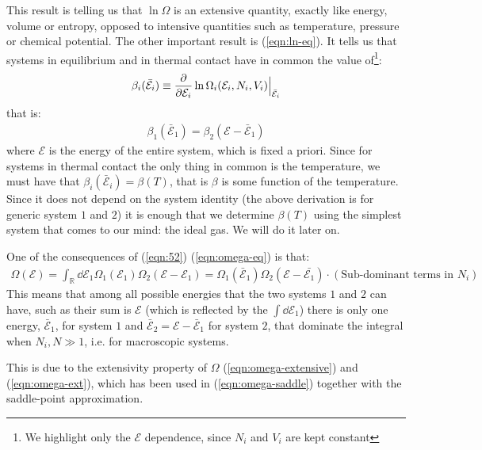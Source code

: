 \documentclass[../../main.tex]{subfiles}
\begin{document}
This result is telling us that $\ln \Omega$ is an extensive quantity, exactly like energy, volume or entropy, opposed to intensive quantities such as temperature, pressure or chemical potential. The other important result is (\ref{eqn:ln-eq}). It tells us that systems in equilibrium and in thermal contact have in common the value of\footnote{We highlight only the $\mathcal{E}$ dependence, since $N_i$ and $V_i$ are kept constant}:
\begin{align*}
    \beta_i(\bar{\mathcal{E}}_i) \equiv \pdv{\mathcal{E}_i} \ln \Omega_i(\mathcal{E}_i, N_i, V_i)\Big|_{\bar{\mathcal{E}}_i}
\end{align*}
that is:
\begin{align*}
    \beta_1(\bar{\mathcal{E}}_1) = \beta_2(\mathcal{E}- \bar{\mathcal{E}}_1)
\end{align*}
where $\mathcal{E}$ is the energy of the entire system, which is fixed a priori. Since for systems in thermal contact the only thing in common is the temperature, we must have that $\beta_i(\bar{\mathcal{E}}_i) = \beta(T)$, that is $\beta$ is some function of the temperature. Since it does not depend on the system identity (the above derivation is for generic system $1$ and $2$) it is enough that we determine $\beta(T)$ using the simplest system that comes to our mind: the ideal gas. We will do it later on.

\medskip

One of the consequences of (\ref{eqn:52}) (\ref{eqn:omega-eq}) is that:
\begin{align*}
    \Omega(\mathcal{E}) = \int_{\mathbb{R}} \dd{\mathcal{E}_1} \Omega_1(\mathcal{E}_1) \Omega_2(\mathcal{E}- \mathcal{E}_1) = \Omega_1(\bar{\mathcal{E}}_1) \Omega_2 (\mathcal{E}-\bar{\mathcal{E}_1}) \cdot (\text{Sub-dominant terms in $N_i$})
\end{align*}
This means that among all possible energies that the two systems $1$ and $2$ can have, such as their sum is $\mathcal{E}$ (which is reflected by the $\int \dd{\mathcal{E}_1}$) there is only one energy, $\bar{\mathcal{E}}_1$, for system $1$ and $\bar{\mathcal{E}}_2 = \mathcal{E}- \bar{\mathcal{E}}_1$ for system $2$, that dominate the integral when $N_i, N \gg 1$, i.e. for macroscopic systems.

This is due to the extensivity property of $\Omega$ (\ref{eqn:omega-extensive}) and (\ref{eqn:omega-ext}), which has been used in (\ref{eqn:omega-saddle}) together with the saddle-point approximation.

\medskip
\end{document}
